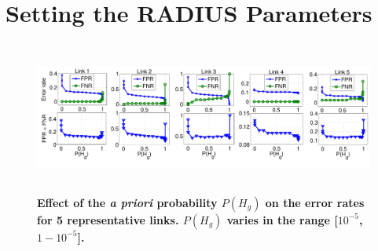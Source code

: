 \section{Setting the RADIUS Parameters}\label{sec:parameterChoice} 

	
\begin{figure}[t]
	\centering
	\includegraphics[width=1.0\linewidth, height = 5cm]{4-Find_ProbGood3}
	\vspace{-1.1cm}
	\caption{\textbf{Effect of the \textit{a priori} probability $P(H_g)$ on the error rates for 5 representative links. $P(H_g)$ varies in the range [$10^{-5}$, $1-10^{-5}$].} }
	\label{fig:EVA-ProbGood}
	\vspace{-0.4cm}
\end{figure}
	
	
	
